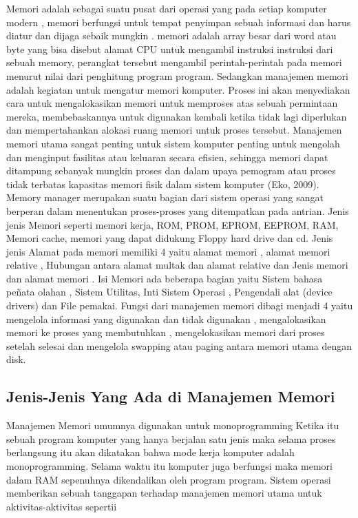 Memori adalah sebagai suatu pusat dari operasi yang pada setiap komputer modern , memori berfungsi untuk tempat penyimpan sebuah informasi dan harus diatur dan dijaga sebaik mungkin . memori adalah array besar dari word atau byte yang bisa disebut alamat CPU untuk mengambil instruksi instruksi dari sebuah memory, perangkat tersebut mengambil perintah-perintah pada memori menurut nilai dari penghitung program  program.
Sedangkan manajemen memori adalah kegiatan untuk mengatur memori komputer. Proses ini akan menyediakan cara untuk mengalokasikan memori untuk memproses atas sebuah  permintaan mereka, membebaskannya untuk digunakan kembali ketika tidak lagi diperlukan dan mempertahankan alokasi ruang memori untuk proses tersebut. Manajemen memori utama sangat penting untuk sistem komputer  penting untuk mengolah dan menginput fasilitas atau keluaran secara efisien, sehingga memori dapat ditampung sebanyak mungkin proses dan dalam upaya pemogram atau proses tidak terbatas kapasitas memori fisik dalam sistem komputer (Eko, 2009).
Memory manager merupakan suatu bagian dari sistem operasi yang sangat berperan dalam menentukan proses-proses yang ditempatkan pada antrian.
Jenis jenis Memori seperti memori kerja, ROM, PROM, EPROM, EEPROM, RAM, Memori cache, memori yang dapat didukung Floppy hard drive dan cd.
Jenis jenis Alamat pada memori memiliki 4 yaitu alamat memori , alamat memori relative , Hubungan antara alamat multak dan alamat relative dan Jenis memori dan alamat memori .
Isi Memori ada beberapa bagian yaitu Sistem bahasa peñata olahan , Sistem Utilitas, Inti Sistem Operasi , Pengendali alat (device drivers) dan File pemakai.
Fungsi dari manajemen memori dibagi menjadi 4 yaitu mengelola informasi yang digunakan dan tidak digunakan , mengalokasikan memori ke proses yang membutuhkan , mengelokasikan memori dari proses setelah selesai dan mengelola swapping atau paging antara memori utama dengan disk.\cite{giuffrida2012enhanced}

\subsection {Jenis-Jenis Yang Ada di Manajemen Memori}
Manajemen Memori umumnya digunakan untuk monoprogramming
Ketika itu sebuah program komputer yang hanya berjalan satu jenis maka selama proses berlangsung itu akan dikatakan bahwa mode kerja komputer adalah monoprogramming. Selama waktu itu komputer juga berfungsi maka memori dalam RAM sepenuhnya dikendalikan oleh program program.
Sistem operasi memberikan sebuah  tanggapan terhadap manajemen memori utama untuk aktivitas-aktivitas sepertii 

